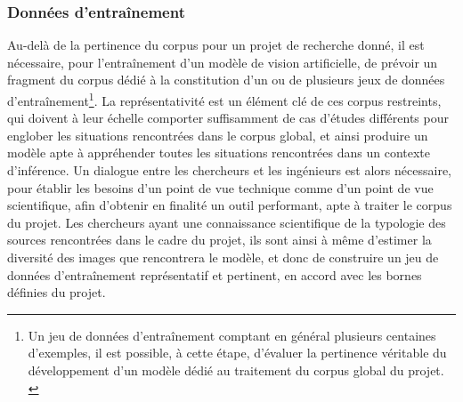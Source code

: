     \subsubsection{Données d'entraînement}
	Au-delà de la pertinence du corpus pour un projet de recherche donné, il est nécessaire, pour l'entraînement d'un modèle de vision artificielle, de prévoir un fragment du corpus dédié à la constitution d'un ou de plusieurs jeux de données d'entraînement\footnote{Un jeu de données d'entraînement comptant en général plusieurs centaines d'exemples, il est possible, à cette étape, d'évaluer la pertinence véritable du développement d'un modèle dédié au traitement du corpus global du projet. \cite{strienComputerVisionHumanities2022}}. La représentativité est un élément clé de ces corpus restreints, qui doivent à leur échelle comporter suffisamment de cas d'études différents pour englober les situations rencontrées dans le corpus global, et ainsi produire un modèle apte à appréhender toutes les situations rencontrées dans un contexte d'inférence. Un dialogue entre les chercheurs et les ingénieurs est alors nécessaire, pour établir les besoins d'un point de vue technique comme d'un point de vue scientifique, afin d'obtenir en finalité un outil performant, apte à traiter le corpus du projet. Les chercheurs ayant une connaissance scientifique de la typologie des sources rencontrées dans le cadre du projet, ils sont ainsi à même d'estimer la diversité des images que rencontrera le modèle, et donc de construire un jeu de données d'entraînement représentatif et pertinent, en accord avec les bornes définies du projet.
	
